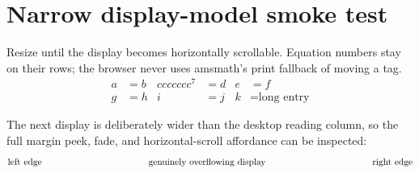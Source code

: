 \section*{Narrow display-model smoke test}
Resize until the display becomes horizontally scrollable. Equation numbers stay
on their rows; the browser never uses amsmath's print fallback of moving a tag.
\begin{align}
  a&=b & ccccccc^7&=d & e&=f \\
  g&=h & i&=j & k&=\text{long entry}
\end{align}

The next display is deliberately wider than the desktop reading column, so the
full margin peek, fade, and horizontal-scroll affordance can be inspected:
\[
  \hbox to 440pt{left edge\hfil genuinely overflowing display\hfil right edge}
\]
